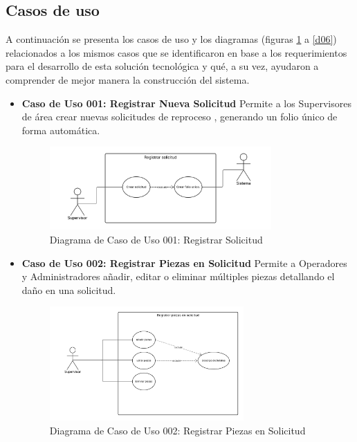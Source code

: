\documentclass[12pt,letterpaper,spanish]{report}
\begin{document}
 \subsection{Casos de uso}
A continuación se presenta los casos de uso y los diagramas (figuras \ref{d01} a \ref{d06}) relacionados a los mismos casos que se identificaron en base a los requerimientos para el desarrollo de esta solución tecnológica y qué, a su vez, ayudaron a comprender de mejor manera la construcción del sistema. 


\begin{itemize}
    \item \textbf{Caso de Uso 001: Registrar Nueva Solicitud} 
    Permite a los Supervisores de área crear nuevas solicitudes de reproceso , generando un folio único de forma automática.
    
\begin{figure}[H]
  \centering
  \includegraphics[width=0.8\textwidth]{DIACU01 (1).png}
  \caption{Diagrama de Caso de Uso 001: Registrar Solicitud}\label{d01}
\end{figure}

    \item \textbf{Caso de Uso 002: Registrar Piezas en Solicitud} 
    Permite a Operadores y Administradores añadir, editar o eliminar múltiples piezas  detallando el daño en una solicitud.
    
    \begin{figure}[H]
  \centering
  \hspace*{-3.5 cm}
  \includegraphics[width=0.7\textwidth]{DIACU02.png}
  \caption{Diagrama de Caso de Uso 002: Registrar Piezas en Solicitud}\label{d02}
\end{figure}
        

\end{itemize}
\end{document}
